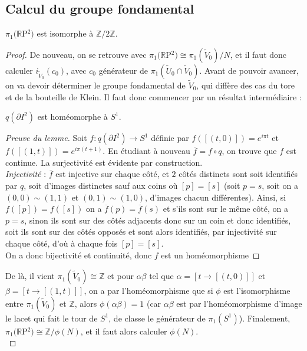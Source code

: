 \subsection{Calcul du groupe fondamental}
\begin{proposition}
    $\pi_1(\mathbb{R}$P$^2)$ est isomorphe à $\mathbb{Z}/2\mathbb{Z}$.
\end{proposition}
\begin{proof}
    De nouveau, on se retrouve avec $\pi_1(\mathbb{R}$P$^2)\cong\pi_1(\tilde{V}_0)/N$, et il faut donc calculer $i_{\tilde{V}_0}(c_0)$, avec $c_0$ générateur de $\pi_1(\tilde{U}_0\cap\tilde{V}_0)$.
    Avant de pouvoir avancer, on va devoir déterminer le groupe fondamental de $\tilde{V}_0$, qui diffère des cas du tore et de la bouteille de Klein. Il faut donc commencer par un résultat intermédiaire :
    \begin{lemme}
        $q(\partial I^2)$ est homéomorphe à $S^1$.
    \end{lemme}
    \begin{proof}[Preuve du lemme]
        Soit $f:q(\partial I^2)\to S^1$ définie par $f([(t,0)])=e^{i\pi t}$ et $f([(1,t)])=e^{i\pi(t+1)}$. En étudiant à nouveau $\overline{f}=f\circ q$, on trouve que $f$ est continue. La surjectivité est évidente par construction.\medskip\\
        \textit{Injectivité} : $\overline{f}$ est injective sur chaque côté, et $2$ côtés distincts sont soit identifiés par $q$, soit d'images distinctes sauf aux coins où $[p]=[s]$ (soit $p=s$, soit on a $(0,0)\sim(1,1)$ et $(0,1)\sim(1,0)$, d'images chacun différentes). Ainsi, si $f([p])=f([s])$ on a $\overline{f}(p)=\overline{f}(s)$ et s'ils sont sur le même côté, on a $p=s$, sinon ils sont sur des côtés adjacents donc sur un coin et donc identifiés, soit ils sont sur des côtés opposés et sont alors identifiés, par injectivité sur chaque côté, d'où à chaque fois $[p]=[s]$.\medskip\\
        On a donc bijectivité et continuité, donc $f$ est un homéomorphisme
    \end{proof}
    De là, il vient $\pi_1(\tilde{V}_0)\cong\mathbb{Z}$ et pour $\alpha\beta$ tel que $\alpha=[t\to[(t,0)]]$ et $\beta=[t\to[(1,t)]]$, on a par l'homéomorphisme que si $\phi$ est l'isomorphisme entre $\pi_1(\tilde{V}_0)$ et $\mathbb{Z}$, alors $\phi(\alpha\beta)=1$ (car $\alpha\beta$ est par l'homéomorphisme d'image le lacet qui fait le tour de $S^1$, de classe le générateur de $\pi_1(S^1)$). Finalement, $\pi_1(\mathbb{R}$P$^2)\cong\mathbb{Z}/\phi(N)$, et il faut alors calculer $\phi(N)$.\medskip\\

\end{proof}
